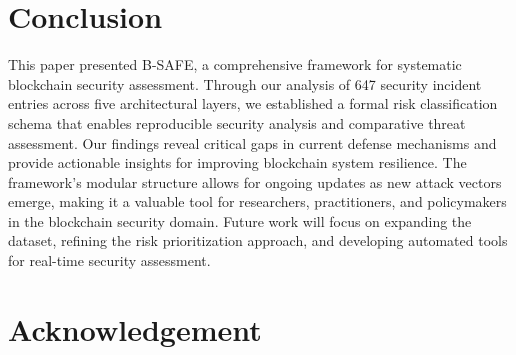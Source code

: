 \documentclass[a4paper]{article}
\begin{document}
\begin{multicols}{2}












\section{Conclusion}
This paper presented B-SAFE, a comprehensive framework for systematic blockchain security assessment. Through our analysis of 647 security incident entries across five architectural layers, we established a formal risk classification schema that enables reproducible security analysis and comparative threat assessment. Our findings reveal critical gaps in current defense mechanisms and provide actionable insights for improving blockchain system resilience. The framework's modular structure allows for ongoing updates as new attack vectors emerge, making it a valuable tool for researchers, practitioners, and policymakers in the blockchain security domain. Future work will focus on expanding the dataset, refining the risk prioritization approach, and developing automated tools for real-time security assessment. 

\section*{Acknowledgement}


\nocite{ChenYao2022,Deloitte2000,Scribbr2020,SlatWorp2019,SlatWorpHolierhoekND,Launiainen2018,Karatas2021,MarahChallenger2023}


\end{multicols}
\end{document}
